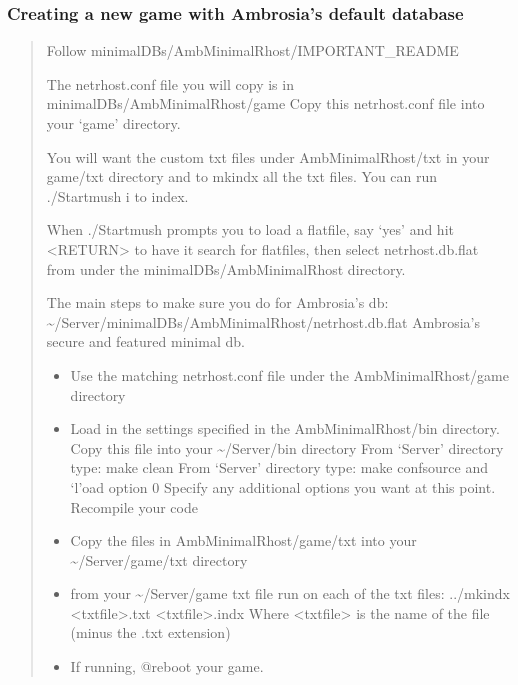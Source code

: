 \documentclass[letterpaper,10pt,english]{sphinxmanual}
\begin{document}
\subsubsection{Creating a new game with Ambrosia’s default database}
\label{\detokenize{installation:creating-a-new-game-with-ambrosia-s-default-database}}\begin{quote}

\sphinxAtStartPar
Follow minimal\sphinxhyphen{}DBs/Amb\sphinxhyphen{}MinimalRhost/IMPORTANT\_README

\sphinxAtStartPar
The netrhost.conf file you will copy is in minimal\sphinxhyphen{}DBs/Amb\sphinxhyphen{}MinimalRhost/game
Copy this netrhost.conf file into your ‘game’ directory.

\sphinxAtStartPar
You will want the custom txt files under Amb\sphinxhyphen{}MinimalRhost/txt in your game/txt
directory and to mkindx all the txt files.  You can run ./Startmush \sphinxhyphen{}i to index.

\sphinxAtStartPar
When ./Startmush prompts you to load a flatfile, say ‘yes’ and hit \textless{}RETURN\textgreater{}
to have it search for flatfiles, then select netrhost.db.flat from under
the minimal\sphinxhyphen{}DBs/Amb\sphinxhyphen{}MinimalRhost directory.

\sphinxAtStartPar
The main steps to make sure you do for Ambrosia’s db:
\textasciitilde{}/Server/minimal\sphinxhyphen{}DBs/Amb\sphinxhyphen{}MinimalRhost/netrhost.db.flat \textendash{} Ambrosia’s secure and featured minimal db.
\begin{itemize}
\item {} 
\sphinxAtStartPar
Use the matching netrhost.conf file under the Amb\sphinxhyphen{}MinimalRhost/game directory

\item {} 
\sphinxAtStartPar
Load in the settings specified in the Amb\sphinxhyphen{}MinimalRhost/bin directory.
\sphinxhyphen{} Copy this file into your \textasciitilde{}/Server/bin directory
\sphinxhyphen{} From ‘Server’ directory type: make clean
\sphinxhyphen{} From ‘Server’ directory type: make confsource and ‘l’oad option 0
\sphinxhyphen{} Specify any \sphinxhyphen{}additional\sphinxhyphen{} options you want at this point.
\sphinxhyphen{} Recompile your code

\item {} 
\sphinxAtStartPar
Copy the files in Amb\sphinxhyphen{}MinimalRhost/game/txt into your \textasciitilde{}/Server/game/txt directory

\item {} 
\sphinxAtStartPar
from your \textasciitilde{}/Server/game txt file run on each of the txt files:
../mkindx \textless{}txtfile\textgreater{}.txt \textless{}txtfile\textgreater{}.indx
Where \textless{}txtfile\textgreater{} is the name of the file (minus the .txt extension)

\item {} 
\sphinxAtStartPar
If running, @reboot your game.

\end{itemize}
\end{quote}
\end{document}
